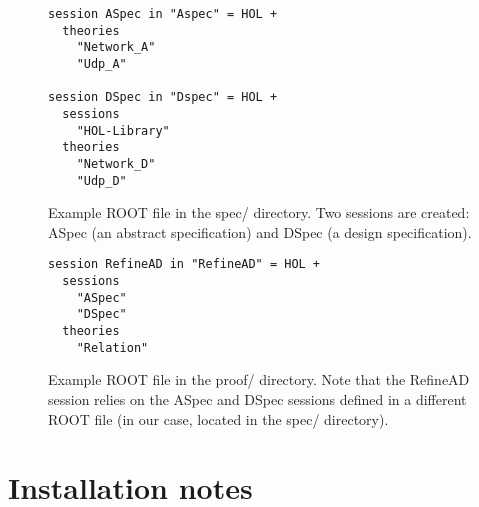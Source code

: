 \documentclass[twoside]{memoir}
\begin{document}
\begin{figure}[htpb]
    \centering
    \begin{lstlisting}[language=isabelle]
session ASpec in "Aspec" = HOL +
  theories
    "Network_A"
    "Udp_A"

session DSpec in "Dspec" = HOL +
  sessions
    "HOL-Library"
  theories
    "Network_D"
    "Udp_D"
    \end{lstlisting}
    
    \caption{Example ROOT file in the spec/ directory. Two sessions are created: ASpec (an abstract specification) and DSpec (a design specification).}
    \label{fig:isabelle-root-file-spec}
\end{figure}

\begin{figure}[htpb]
    \centering
    \begin{lstlisting}[language=isabelle]
session RefineAD in "RefineAD" = HOL +
  sessions
    "ASpec"
    "DSpec"
  theories
    "Relation"
    \end{lstlisting}
    
    \caption{Example ROOT file in the proof/ directory. Note that the RefineAD session relies on the ASpec and DSpec sessions defined in a different ROOT file (in our case, located in the spec/ directory).}
    \label{fig:isabelle-root-file-proof}
\end{figure}

\section{Installation notes}

\backmatter

\end{document}
